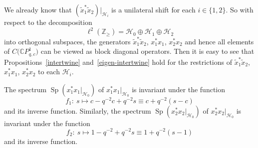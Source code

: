 \documentclass[pdftex]{sigma}
\begin{document}
We already know that $( \tilde{x}_{1}^{\ast}\tilde{x}_{2})
|_{\mathcal{H}_{i}}$ is a unilateral shift for each $i\in\{ 1,2\}
$. So with respect to the decomposition
\[
\ell^{2}( \mathbb{Z}_{\geq}) =\mathcal{H}_{0}\oplus
\mathcal{H}_{1}\oplus\mathcal{H}_{2}%
\]
into orthogonal subspaces, the generators $\tilde{x}_{1}^{\ast}\tilde{x}_{2}$,
$x_{1}^{\ast}x_{1}$, $x_{2}^{\ast}x_{2}$ and hence all elements of $C\big(
\mathbb{C}P_{q,c}^{1}\big) $ can be viewed as block diagonal operators.
Then it is easy to see that Propositions~\ref{intertwine} and~\ref{eigen-intertwine} hold for the
restrictions of $\tilde{x}_{1}^{\ast}\tilde{x}_{2}$, $x_{1}^{\ast}x_{1}$,
$x_{2}^{\ast}x_{2}$ to each $\mathcal{H}_{i}$.

\begin{lemma}\label{invariant-spectrum} The spectrum $\operatorname{Sp}( x_{1}^{\ast}%
x_{1}|_{\mathcal{H}_{0}}) $ of $x_{1}^{\ast}x_{1}|_{\mathcal{H}_{0}}$
is invariant under the function
\[
f_{1}\colon \ s\mapsto c-q^{-2}c+q^{-2}s\equiv c+q^{-2}(s-c)
\]
and its inverse function. Similarly, the spectrum $\operatorname{Sp}(
x_{2}^{\ast}x_{2}|_{\mathcal{H}_{0}}) $ of $x_{2}^{\ast}x_{2}%
|_{\mathcal{H}_{0}}$ is invariant under the function%
\[
f_{2}\colon \ s\mapsto1-q^{-2}+q^{-2}s\equiv1+q^{-2}(s-1)
\]
and its inverse function.
\end{lemma}
\end{document}
